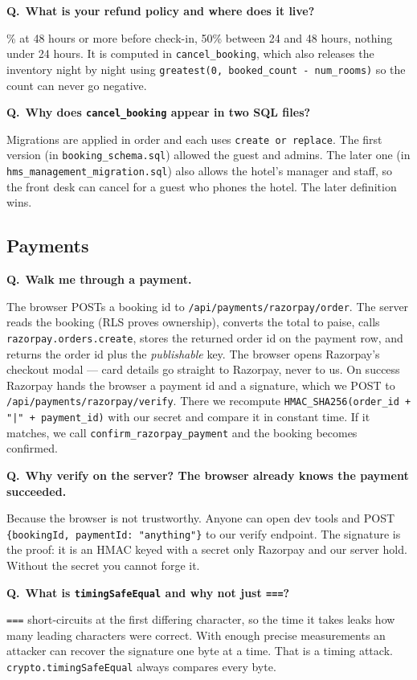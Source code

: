 \documentclass[11pt,a4paper]{article}
\newcommand{\Q}[1]{\vspace{7pt}\noindent\textbf{\color{primary}Q.}~\textbf{#1}\par\vspace{1pt}}
\newcommand{\A}[1]{\noindent #1\par}
\newcommand{\file}[1]{\texttt{\small #1}}
\begin{document}
\Q{What is your refund policy and where does it live?}
\A{100\% at 48 hours or more before check-in, 50\% between 24 and 48 hours,
nothing under 24 hours. It is computed in \texttt{cancel\_booking}, which also
releases the inventory night by night using \texttt{greatest(0, booked\_count -
num\_rooms)} so the count can never go negative.}

\Q{Why does \texttt{cancel\_booking} appear in two SQL files?}
\A{Migrations are applied in order and each uses \texttt{create or replace}. The
first version (in \file{booking\_schema.sql}) allowed the guest and admins. The
later one (in \file{hms\_management\_migration.sql}) also allows the hotel's
manager and staff, so the front desk can cancel for a guest who phones the hotel.
The later definition wins.}

\subsection{Payments}

\Q{Walk me through a payment.}
\A{The browser POSTs a booking id to \file{/api/payments/razorpay/order}. The
server reads the booking (RLS proves ownership), converts the total to paise, calls
\texttt{razorpay.orders.create}, stores the returned order id on the payment row,
and returns the order id plus the \emph{publishable} key. The browser opens
Razorpay's checkout modal --- card details go straight to Razorpay, never to us. On
success Razorpay hands the browser a payment id and a signature, which we POST to
\file{/api/payments/razorpay/verify}. There we recompute
\texttt{HMAC\_SHA256(order\_id + "|" + payment\_id)} with our secret and compare it
in constant time. If it matches, we call \texttt{confirm\_razorpay\_payment} and
the booking becomes confirmed.}

\Q{Why verify on the server? The browser already knows the payment succeeded.}
\A{Because the browser is not trustworthy. Anyone can open dev tools and POST
\texttt{\{bookingId, paymentId: "anything"\}} to our verify endpoint. The signature
is the proof: it is an HMAC keyed with a secret only Razorpay and our server hold.
Without the secret you cannot forge it.}

\Q{What is \texttt{timingSafeEqual} and why not just \texttt{===}?}
\A{\texttt{===} short-circuits at the first differing character, so the time it
takes leaks how many leading characters were correct. With enough precise
measurements an attacker can recover the signature one byte at a time. That is a
timing attack. \texttt{crypto.timingSafeEqual} always compares every byte.}
\end{document}
